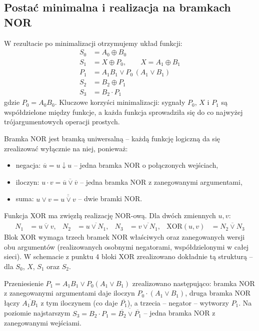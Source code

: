 \documentclass[11pt]{article}
\begin{document}
\subsection{Postać minimalna i realizacja na bramkach NOR}

W rezultacie po minimalizacji otrzymujemy układ funkcji:
\begin{align}
S_0 &= A_0 \oplus B_0 \\
S_1 &= X \oplus P_0, \qquad X = A_1 \oplus B_1 \\
P_1 &= A_1 B_1 \lor P_0\,(A_1 \lor B_1) \\
S_2 &= B_2 \oplus P_1 \\
S_3 &= B_2 \cdot P_1
\end{align}
gdzie \(P_0 = A_0 B_0\). Kluczowe korzyści minimalizacji: sygnały \(P_0\), \(X\) i \(P_1\) są współdzielone między funkcje, a każda funkcja sprowadziła się do co najwyżej trójargumentowych operacji prostych.

Bramka NOR jest bramką uniwersalną -- każdą funkcję logiczną da się zrealizować wyłącznie na niej, ponieważ:
\begin{itemize}
    \item negacja: \(\overline{u} = u \downarrow u\) -- jedna bramka NOR o połączonych wejściach,
    \item iloczyn: \(u \cdot v = \overline{\overline{u} \lor \overline{v}}\) -- jedna bramka NOR z zanegowanymi argumentami,
    \item suma: \(u \lor v = \overline{\overline{u \lor v}}\) -- dwie bramki NOR.
\end{itemize}

Funkcja XOR ma zwięzłą realizację NOR-ową. Dla dwóch zmiennych \(u, v\):
\begin{align}
N_1 &= \overline{u \lor v}, & N_2 &= \overline{u \lor N_1}, & N_3 &= \overline{v \lor N_1}, & \text{XOR}(u,v) &= \overline{N_2 \lor N_3}
\end{align}
Blok XOR wymaga trzech bramek NOR właściwych oraz zanegowanych wersji obu argumentów (realizowanych osobnymi negatorami, współdzielonymi w całej sieci). W schemacie z punktu 4 bloki XOR zrealizowano dokładnie tą strukturą -- dla \(S_0\), \(X\), \(S_1\) oraz \(S_2\).

Przeniesienie \(P_1 = A_1B_1 \lor P_0(A_1 \lor B_1)\) zrealizowano następująco: bramka NOR z zanegowanymi argumentami daje iloczyn \(P_0 \cdot (A_1 \lor B_1)\), druga bramka NOR łączy \(\overline{A_1 B_1}\) z tym iloczynem (co daje \(\overline{P_1}\)), a trzecia -- negator -- wytworzy \(P_1\). Na poziomie najstarszym \(S_3 = B_2 \cdot P_1 = \overline{\overline{B_2} \lor \overline{P_1}}\) -- jedna bramka NOR z zanegowanymi wejściami.
\end{document}
